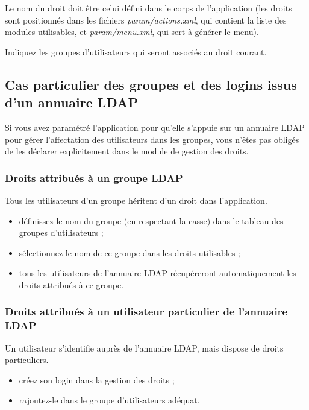 Le nom du droit doit être celui défini dans le corps de l'application (les droits sont positionnés dans les fichiers \textit{param/actions.xml}, qui contient la liste des modules utilisables, et \textit{param/menu.xml}, qui sert à générer le menu).

Indiquez les groupes d'utilisateurs qui seront associés au droit courant.

\subsection{Cas particulier des groupes et des logins issus d'un annuaire LDAP}

Si vous avez paramétré l'application pour qu'elle s'appuie sur un annuaire LDAP pour gérer l'affectation des utilisateurs dans les groupes, vous n'êtes pas obligés de les déclarer explicitement dans le module de gestion des droits.

\subsubsection{Droits attribués à un groupe LDAP}

Tous les utilisateurs d'un groupe héritent d'un droit dans l'application.

\begin{itemize}
\item définissez le nom du groupe (en respectant la casse) dans le tableau des groupes d'utilisateurs ;
\item sélectionnez le nom de ce groupe dans les droits utilisables ;
\item tous les utilisateurs de l'annuaire LDAP récupéreront automatiquement les droits attribués à ce groupe.
\end{itemize}

\subsubsection{Droits attribués à un utilisateur particulier de l'annuaire LDAP}

Un utilisateur s'identifie auprès de l'annuaire LDAP, mais dispose de droits particuliers.

\begin{itemize}
\item créez son login dans la gestion des droits ;
\item rajoutez-le dans le groupe d'utilisateurs adéquat.
\end{itemize}


